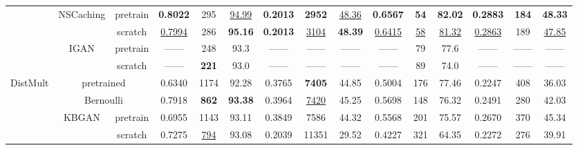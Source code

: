 \documentclass[conference]{IEEEtran}
\begin{document}
\begin{table*}[ht]
\begin{tabular}{c|c c|c c c|ccc|ccc|ccc}
	                          & NSCaching & pretrain &  \textbf{0.8022}   & 295             & \underline{94.99}      &  \textbf{0.2013}   &  \textbf{2952}   &   \underline{48.36}    &  \textbf{0.6567}   &    \textbf{54}    &     \textbf{82.02}      &  \textbf{0.2883}   &  \textbf{184}   &     \textbf{48.33}     \\
	                          &                 & scratch  & \underline{0.7994} & 286             & \textbf{95.16}         &  \textbf{0.2013}   & \underline{3104} &     \textbf{48.39}     & \underline{0.6415} &  \underline{58}   &    \underline{81.32}    & \underline{0.2863} &       189       &   \underline{47.85}    \\
	                          &      IGAN       & pretrain &       ------       & 248             & 93.3                   &       ------       &      ------      &         ------         &       ------       &        79         &         {77.6}          &       ------       &     ------      &         ------         \\
	                          &                 & scratch  &       ------       & \textbf{221}    & 93.0                   &       ------       &      ------      &         ------         &       ------       &        89         &          74.0           &       ------       &     ------      &         ------         \\ \hline\hline
	\multirow{6}{*}{DistMult} &   \multicolumn{2}{c|}{pretrained}    &       0.6340       & 1174            & 92.28                  &       0.3765       &  \textbf{7405}   &         44.85          &       0.5004       &        176        &          77.46          &       0.2247       &       408       &         36.03          \\
	                          &    \multicolumn{2}{c|}{Bernoulli}    &       0.7918       & \textbf{862}    & \textbf{93.38}         &       0.3964       & \underline{7420} &         45.25          &       0.5698       &        148        &         {76.32}         &       0.2491       &       280       &         42.03          \\
	                          &      KBGAN      & pretrain &       0.6955       & 1143            & 93.11                  &       0.3849       &       7586       &         44.32          &       0.5568       &        201        &          75.57          &       0.2670       &       370       &         45.34          \\
	                          &                 & scratch  &       0.7275       & \underline{794} & 93.08                  &       0.2039       &      11351       &         29.52          &       0.4227       &        321        &          64.35          &       0.2272       &      {276}      &         39.91          \\

\end{tabular}
\end{table*}
\end{document}
